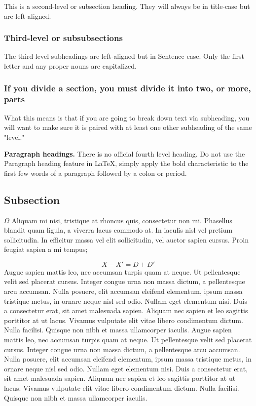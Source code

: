 This is a second-level or subsection heading. They will always be in title-case but are left-aligned. 

\subsubsection{Third-level or subsubsections}
The third level subheadings are left-aligned but in Sentence case. Only the first letter and any proper nouns are capitalized. 

\subsubsection{If you divide a section, you must divide it into two, or more, parts}
What this means is that if you are going to break down text via subheading, you will want to make sure it is paired with at least one other subheading of the same "level." 

{\bf Paragraph headings.} There is no official fourth level heading. Do not use the Paragraph heading feature in LaTeX, simply apply the bold characteristic to the first few words of a paragraph followed by a colon or period.

\subsection{Subsection}

\(\Omega\) Aliquam mi nisi, tristique at rhoncus quis, consectetur non mi. Phasellus blandit quam ligula, a viverra lacus commodo at. In iaculis nisl vel pretium sollicitudin. In efficitur massa vel elit sollicitudin, vel auctor sapien cursus. Proin feugiat sapien a mi tempus;

\begin{equation}
       X-X'=D+D' 
\end{equation}
Augue sapien mattis leo, nec accumsan turpis quam at neque. Ut pellentesque velit sed
placerat cursus. Integer congue urna non massa dictum, a pellentesque arcu accumsan. Nulla
posuere, elit accumsan eleifend elementum, ipsum massa tristique metus, in ornare neque nisl sed
odio. Nullam eget elementum nisi. Duis a consectetur erat, sit amet malesuada sapien. Aliquam
nec sapien et leo sagittis porttitor at ut lacus. Vivamus vulputate elit vitae libero condimentum
dictum. Nulla facilisi. Quisque non nibh et massa ullamcorper iaculis.
Augue sapien mattis leo, nec accumsan turpis quam at neque. Ut pellentesque velit sed
placerat cursus. Integer congue urna non massa dictum, a pellentesque arcu accumsan. Nulla
posuere, elit accumsan eleifend elementum, ipsum massa tristique metus, in ornare neque nisl sed
odio. Nullam eget elementum nisi. Duis a consectetur erat, sit amet malesuada sapien. Aliquam
nec sapien et leo sagittis porttitor at ut lacus. Vivamus vulputate elit vitae libero condimentum
dictum. Nulla facilisi. Quisque non nibh et massa ullamcorper iaculis.


